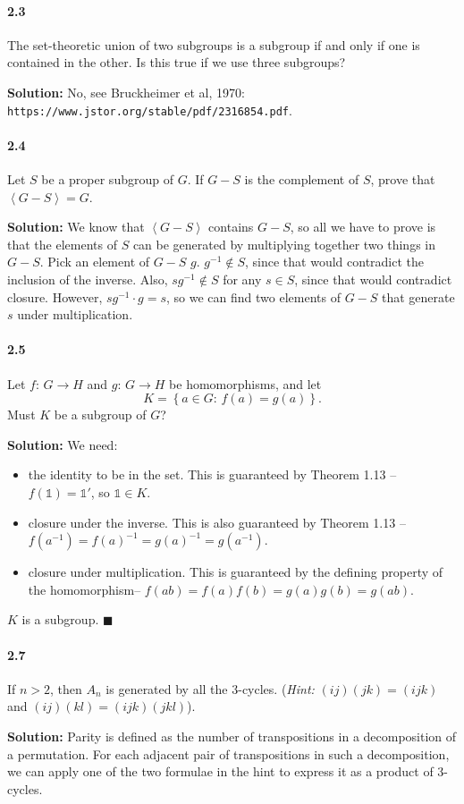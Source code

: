 \documentclass[12pt,a4paper]{article}
\providecommand{\id}{\mathbb{1}}
\providecommand{\hint}{\emph{Hint: }}
\providecommand{\soln}{\textbf{Solution: }}
\providecommand{\set}[1]{\left \lbrace #1 \right \rbrace}
\renewcommand{\iff}{\textrm{if and only if}\xspace}
\providecommand{\inv}{^{-1}}
\providecommand{\gen}[1]{\left \langle #1 \right \rangle}
\providecommand{\hism}{homomorphism\xspace}
\begin{document}
\paragraph*{2.3}
The set-theoretic union of two subgroups is a subgroup \iff one is contained in the other. 
Is this true if we use three subgroups?

\soln No, see Bruckheimer et al, 1970: \texttt{https://www.jstor.org/stable/pdf/2316854.pdf}.

\paragraph*{2.4}
Let $S$ be a proper subgroup of $G$. 
If $G - S$ is the complement of $S$, prove that $\gen{G - S} = G$.

\soln We know that $\gen{G - S}$ contains $G - S$, so all we have to prove is that the elements of $S$ can be generated by multiplying together two things in $G - S$.
Pick an element of $G - S$ $g$. 
$g^{-1} \notin S$, since that would contradict the inclusion of the inverse. 
Also, $sg^{-1} \notin S$ for any $s \in S$, since that would contradict closure.  
However, $sg^{-1} \cdot g = s$, so we can find two elements of $G - S$ that generate $s$ under multiplication. 

\paragraph*{2.5}
Let $f: \, G \rightarrow H$ and $g: \, G \rightarrow H$ be \hism{s}, and let
\begin{equation*}
K = \set{a \in G: \, f(a) = g(a)}.
\end{equation*}
Must $K$ be a subgroup of $G$?

\soln We need: 
\begin{itemize}
	\item the identity to be in the set.
	This is guaranteed by Theorem 1.13 -- $f(\id) = \id'$, so $\id \in K$.
	\item closure under the inverse. 
	This is also guaranteed by Theorem 1.13 -- $f(a\inv) = f(a)\inv = g(a)\inv = g(a\inv)$.
	\item closure under multiplication. 
	This is guaranteed by the defining property of the \hism -- $f(a b) = f(a) f(b) = g(a) g(b) = g(a b)$. 
\end{itemize}
$K$ is a subgroup. $\blacksquare$

\paragraph*{2.7}
If $n > 2$, then $A_n$ is generated by all the $3$-cycles. (\hint $(ij)(jk)=(ijk)$ and $(ij)(kl)=(ijk)(jkl)$).

\soln Parity is defined as the number of transpositions in a decomposition of a permutation.
For each adjacent pair of transpositions in such a decomposition, we can apply one of the two formulae in the hint to express it as a product of 3-cycles.
\end{document}
